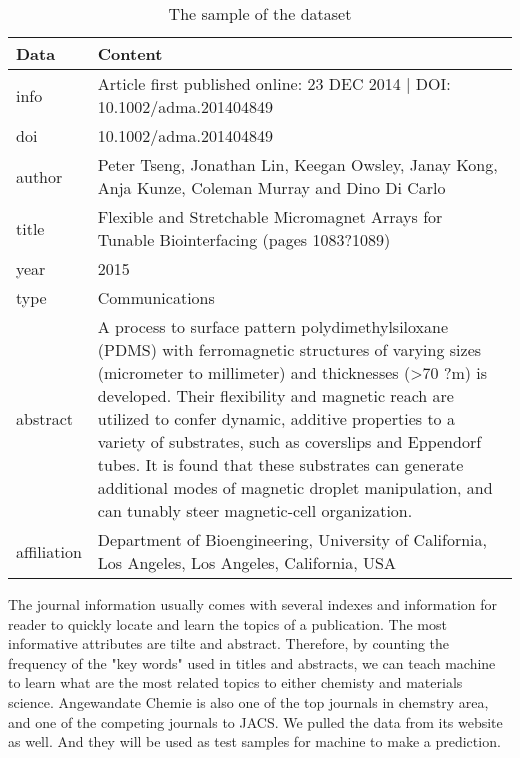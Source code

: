 \documentclass[conference]{IEEEtran}
\begin{document}
\begin{table}
    \caption{The sample of the dataset\label{tab:data-sample}}
    \begin{center}
        \begin{tabular}{ p{1cm} | p{6cm} }
            \hline
            \bf{Data} & \bf{Content}\\
            \hline
            info & Article first published online: 23 DEC 2014 | DOI: 10.1002/adma.201404849\\
            \hline
            doi & 10.1002/adma.201404849\\
            \hline
            author & Peter Tseng, Jonathan Lin, Keegan Owsley, Janay Kong, Anja Kunze, Coleman Murray and Dino Di Carlo \\
            \hline
            title & Flexible and Stretchable Micromagnet Arrays for Tunable Biointerfacing (pages 1083?1089) \\
            \hline
            year & 2015 \\
            \hline
            type & Communications \\
            \hline
            abstract & A process to surface pattern polydimethylsiloxane (PDMS) with ferromagnetic structures of varying sizes (micrometer to millimeter) and thicknesses (>70 ?m) is developed. Their flexibility and magnetic reach are utilized to confer dynamic, additive properties to a variety of substrates, such as coverslips and Eppendorf tubes. It is found that these substrates can generate additional modes of magnetic droplet manipulation, and can tunably steer magnetic-cell organization.\\
            \hline
            affiliation & Department of Bioengineering, University of California, Los Angeles, Los Angeles, California, USA\\
            \hline
        \end{tabular}
    \end{center}
\end{table}

The journal information usually comes with several indexes and information for reader to quickly locate and learn the topics of a publication. The most informative attributes are tilte and abstract. Therefore, by counting the frequency of the "key words" used in titles and abstracts, we can teach machine to learn what are the most related topics to either chemisty and materials science. Angewandate Chemie is also one of the top journals in chemstry area, and one of the competing journals to JACS. We pulled the data from its website as well. And they will be used as test samples for machine to make a prediction.
\end{document}
